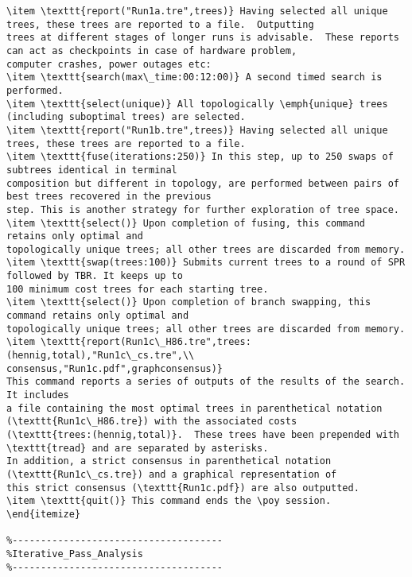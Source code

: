 \begin{verbatim}
\item \texttt{report("Run1a.tre",trees)} Having selected all unique trees, these trees are reported to a file.  Outputting
trees at different stages of longer runs is advisable.  These reports can act as checkpoints in case of hardware problem, 
computer crashes, power outages etc: 
\item \texttt{search(max\_time:00:12:00)} A second timed search is performed.  
\item \texttt{select(unique)} All topologically \emph{unique} trees (including suboptimal trees) are selected.
\item \texttt{report("Run1b.tre",trees)} Having selected all unique trees, these trees are reported to a file.  
\item \texttt{fuse(iterations:250)} In this step, up to 250 swaps of subtrees identical in terminal 
composition but different in topology, are performed between pairs of best trees recovered in the previous 
step. This is another strategy for further exploration of tree space.
\item \texttt{select()} Upon completion of fusing, this command retains only optimal and 
topologically unique trees; all other trees are discarded from memory.
\item \texttt{swap(trees:100)} Submits current trees to a round of SPR followed by TBR. It keeps up to 
100 minimum cost trees for each starting tree.
\item \texttt{select()} Upon completion of branch swapping, this command retains only optimal and 
topologically unique trees; all other trees are discarded from memory.
\item \texttt{report(Run1c\_H86.tre",trees:(hennig,total),"Run1c\_cs.tre",\\ consensus,"Run1c.pdf",graphconsensus)} 
This command reports a series of outputs of the results of the search.  It includes 
a file containing the most optimal trees in parenthetical notation (\texttt{Run1c\_H86.tre}) with the associated costs 
(\texttt{trees:(hennig,total)}.  These trees have been prepended with \texttt{tread} and are separated by asterisks. 
In addition, a strict consensus in parenthetical notation (\texttt{Run1c\_cs.tre}) and a graphical representation of 
this strict consensus (\texttt{Run1c.pdf}) are also outputted.
\item \texttt{quit()} This command ends the \poy session.
\end{itemize}

%-------------------------------------
%Iterative_Pass_Analysis
%-------------------------------------


\end{verbatim}
